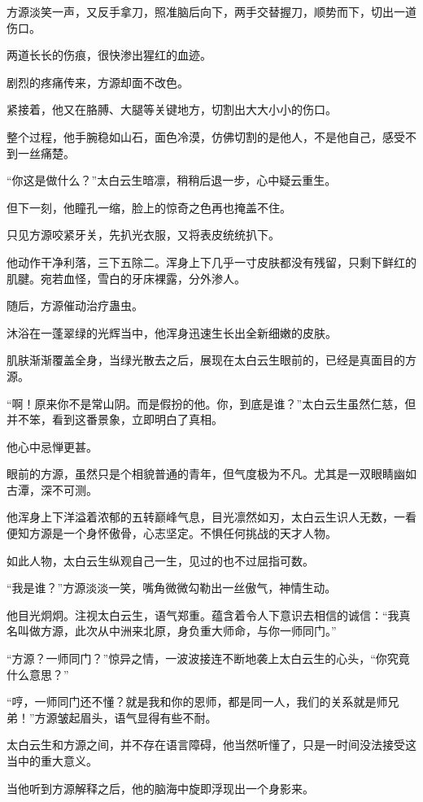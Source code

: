 \begin{this_body}
方源淡笑一声，又反手拿刀，照准脑后向下，两手交替握刀，顺势而下，切出一道伤口。

两道长长的伤痕，很快渗出猩红的血迹。

剧烈的疼痛传来，方源却面不改色。

紧接着，他又在胳膊、大腿等关键地方，切割出大大小小的伤口。

整个过程，他手腕稳如山石，面色冷漠，仿佛切割的是他人，不是他自己，感受不到一丝痛楚。

“你这是做什么？”太白云生暗凛，稍稍后退一步，心中疑云重生。

但下一刻，他瞳孔一缩，脸上的惊奇之色再也掩盖不住。

只见方源咬紧牙关，先扒光衣服，又将表皮统统扒下。

他动作干净利落，三下五除二。浑身上下几乎一寸皮肤都没有残留，只剩下鲜红的肌腱。宛若血怪，雪白的牙床裸露，分外渗人。

随后，方源催动治疗蛊虫。

沐浴在一蓬翠绿的光辉当中，他浑身迅速生长出全新细嫩的皮肤。

肌肤渐渐覆盖全身，当绿光散去之后，展现在太白云生眼前的，已经是真面目的方源。

“啊！原来你不是常山阴。而是假扮的他。你，到底是谁？”太白云生虽然仁慈，但并不笨，看到这番景象，立即明白了真相。

他心中忌惮更甚。

眼前的方源，虽然只是个相貌普通的青年，但气度极为不凡。尤其是一双眼睛幽如古潭，深不可测。

他浑身上下洋溢着浓郁的五转巅峰气息，目光凛然如刃，太白云生识人无数，一看便知方源是一个身怀傲骨，心志坚定。不惧任何挑战的天才人物。

如此人物，太白云生纵观自己一生，见过的也不过屈指可数。

“我是谁？”方源淡淡一笑，嘴角微微勾勒出一丝傲气，神情生动。

他目光炯炯。注视太白云生，语气郑重。蕴含着令人下意识去相信的诚信：“我真名叫做方源，此次从中洲来北原，身负重大师命，与你一师同门。”

“方源？一师同门？”惊异之情，一波波接连不断地袭上太白云生的心头，“你究竟什么意思？”

“哼，一师同门还不懂？就是我和你的恩师，都是同一人，我们的关系就是师兄弟！”方源皱起眉头，语气显得有些不耐。

太白云生和方源之间，并不存在语言障碍，他当然听懂了，只是一时间没法接受这当中的重大意义。

当他听到方源解释之后，他的脑海中旋即浮现出一个身影来。


\end{this_body}
